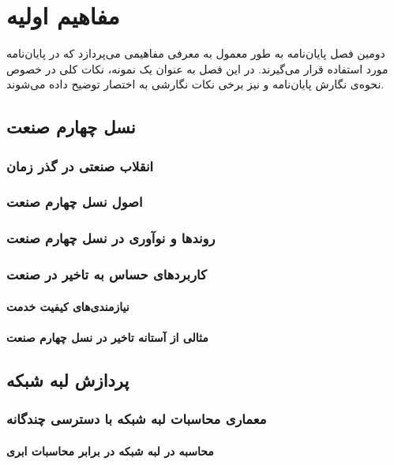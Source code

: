 
\chapter{مفاهیم اولیه}


دومین فصل پایان‌نامه به طور معمول به معرفی مفاهیمی می‌پردازد که در پایان‌نامه مورد استفاده قرار می‌گیرند.
در این فصل به عنوان یک نمونه، نکات کلی در خصوص نحوه‌ی نگارش پایان‌نامه
و نیز برخی نکات نگارشی به اختصار توضیح داده می‌شوند.

\section{نسل چهارم صنعت}

\subsection{انقلاب صنعتی در گذر زمان}
\subsection{اصول نسل چهارم صنعت}
\subsection{روندها و نوآوری در نسل چهارم صنعت}
\subsection{کاربردهای حساس به تاخیر در صنعت}
\subsubsection{نیازمندی‌های کیفیت خدمت}
\subsubsection{مثالی از آستانه‌ تاخیر در نسل چهارم صنعت}

\section{پردازش لبه شبکه}
\subsection{معماری محاسبات لبه شبکه با دسترسی چندگانه}
\subsubsection{محاسبه در لبه شبکه در برابر محاسبات ابری}
